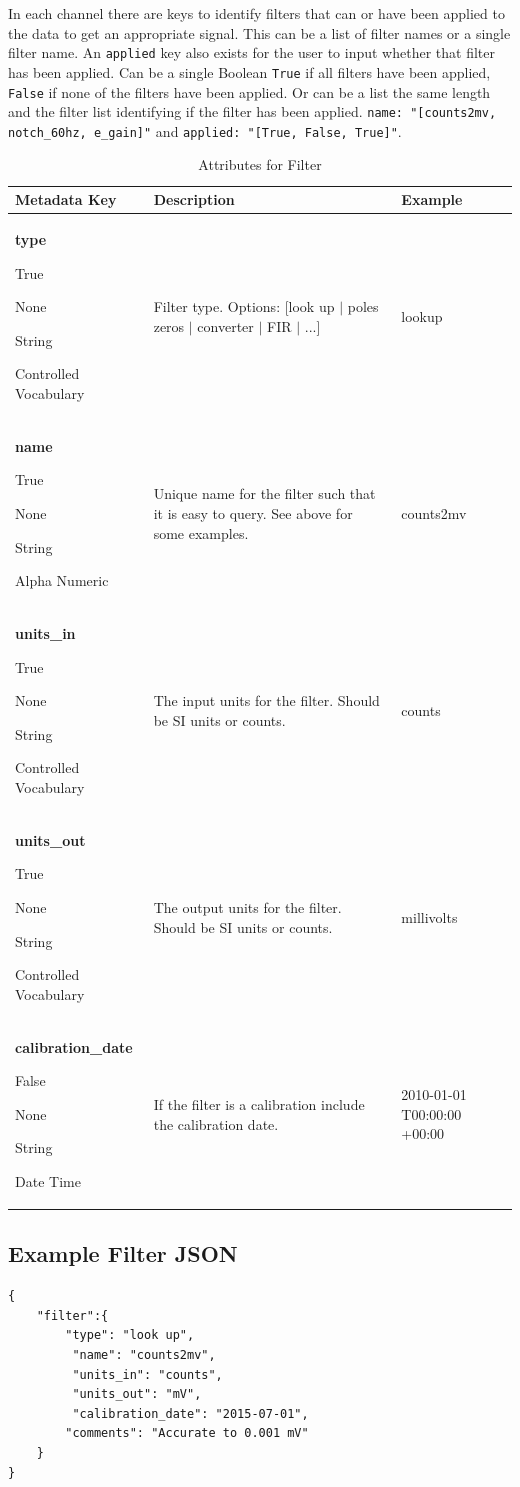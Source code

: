 \documentclass[12pt]{article}
\newcommand{\entry}[7]{
	\textbf{#1} 
	\begin{itemize}[topsep=5pt,itemsep=-.1pt,parsep=-2pt,partopsep=0pt,labelwidth=2em,align=left,itemindent=1em]
		\begin{small}
			\item[Required:] #2
			\item[Units:] #3
			\item[Type:] #4
			\item[Style:] #5
		\end{small}
	\end{itemize} & #6 & #7 \\ \midrule}
\begin{document}
In each channel there are keys to identify filters that can or have been applied to the data to get an appropriate signal.  This can be a list of filter names or a single filter name.  An \verb|applied| key also exists for the user to input whether that filter has been applied.  Can be a single Boolean \verb|True| if all filters have been applied, \verb|False| if none of the filters have been applied.  Or can be a list the same length and the filter list identifying if the filter has been applied.  \verb|name: "[counts2mv, notch_60hz, e_gain]"| and \verb|applied: "[True, False, True]"|. 

\begin{table}[h!]
	\caption[Attributes for Filter ]{Attributes for Filter }
	\begin{tabular}{p{}>{\raggedright}p{}p{}}
		\textbf{Metadata Key} & \textbf{Description} & \textbf{Example} \\ \toprule
		\entry{type}{True}{None}{String}{Controlled Vocabulary}{Filter type. Options: [look up $|$ poles zeros $|$ converter $|$ FIR $|$ ...] }{lookup}
		\entry{name}{True}{None}{String}{Alpha Numeric}{Unique name for the filter such that it is easy to query.  See above for some examples.}{counts2mv}
		\entry{units\_in}{True}{None}{String}{Controlled Vocabulary}{The input units for the filter. Should be SI units or counts.}{counts}
		\entry{units\_out}{True}{None}{String}{Controlled Vocabulary}{The output units for the filter. Should be SI units or counts.}{millivolts}
		\entry{calibration\_date}{False}{None}{String}{Date Time}{If the filter is a calibration include the calibration date.}{2010-01-01 T00:00:00 +00:00}
		
	\end{tabular}
	\label{tab:filter}
\end{table}

\subsection{Example Filter JSON} 

\begin{verbatim}
{
    "filter":{
        "type": "look up",
         "name": "counts2mv",
         "units_in": "counts",
         "units_out": "mV",
         "calibration_date": "2015-07-01",
        "comments": "Accurate to 0.001 mV"
    }
}
\end{verbatim}

\clearpage
\newpage
\end{document}
